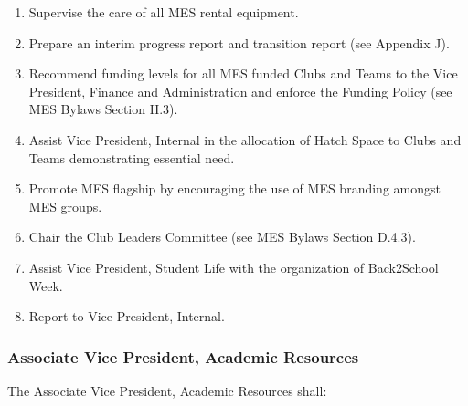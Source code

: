 \begin{enumerate}
 \item
  Supervise the care of all MES rental equipment.
 \item
  Prepare an interim progress report and transition report (see Appendix
  J).
 \item
  Recommend funding levels for all MES funded Clubs and Teams to the
  Vice President, Finance and Administration and enforce the Funding
  Policy (see MES Bylaws Section H.3).
 \item
  Assist Vice President, Internal in the allocation of Hatch Space to
  Clubs and Teams demonstrating essential need.
 \item
  Promote MES flagship by encouraging the use of MES branding amongst
  MES groups.
 \item
  Chair the Club Leaders Committee (see MES Bylaws Section D.4.3).
 \item
  Assist Vice President, Student Life with the organization of
  Back2School Week.
 \item
  Report to Vice President, Internal.

\end{enumerate}

\hypertarget{associate-vice-president-academic-resources}{%
 \subsubsection{Associate Vice President, Academic
  Resources}
 \label{associate-vice-president-academic-resources}}
The Associate Vice President, Academic Resources shall:

